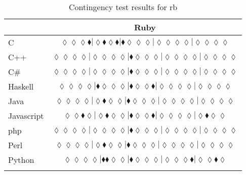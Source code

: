 \begin{table*}
\centering
\begin{tabular}{l c}
& Ruby \\
\hline

C & $\scriptscriptstyle\lozenge\lozenge\lozenge\blacklozenge|\lozenge\blacklozenge\lozenge\blacklozenge|\blacklozenge\lozenge\lozenge\lozenge|\lozenge\lozenge\lozenge\lozenge|\lozenge\lozenge\lozenge\lozenge$ \\
C++ & $\scriptscriptstyle\lozenge\lozenge\lozenge\lozenge|\lozenge\lozenge\lozenge\lozenge|\blacklozenge\lozenge\lozenge\lozenge|\lozenge\lozenge\lozenge\lozenge|\lozenge\lozenge\lozenge\lozenge$ \\
C\# & $\scriptscriptstyle\lozenge\lozenge\lozenge\lozenge|\lozenge\lozenge\lozenge\lozenge|\blacklozenge\lozenge\lozenge\lozenge|\lozenge\lozenge\lozenge\lozenge|\lozenge\lozenge\lozenge\lozenge$ \\
Haskell & $\scriptscriptstyle\lozenge\lozenge\lozenge\lozenge|\blacklozenge\lozenge\lozenge\lozenge|\blacklozenge\lozenge\lozenge\blacklozenge|\lozenge\lozenge\lozenge\lozenge|\lozenge\lozenge\lozenge\lozenge$ \\
Java & $\scriptscriptstyle\lozenge\lozenge\lozenge\lozenge|\lozenge\blacklozenge\lozenge\lozenge|\blacklozenge\lozenge\lozenge\lozenge|\lozenge\lozenge\lozenge\lozenge|\lozenge\lozenge\lozenge\lozenge$ \\
Javascript & $\scriptscriptstyle\lozenge\lozenge\blacklozenge\lozenge|\lozenge\blacklozenge\lozenge\lozenge|\blacklozenge\lozenge\lozenge\blacklozenge|\lozenge\lozenge\lozenge\lozenge|\lozenge\blacklozenge\lozenge\lozenge$ \\
{\sc php} & $\scriptscriptstyle\lozenge\lozenge\lozenge\lozenge|\lozenge\lozenge\lozenge\lozenge|\blacklozenge\lozenge\lozenge\lozenge|\lozenge\lozenge\lozenge\lozenge|\lozenge\lozenge\lozenge\lozenge$ \\
Perl & $\scriptscriptstyle\lozenge\lozenge\lozenge\lozenge|\lozenge\blacklozenge\lozenge\lozenge|\blacklozenge\lozenge\lozenge\lozenge|\lozenge\lozenge\lozenge\lozenge|\lozenge\lozenge\lozenge\lozenge$ \\
Python & $\scriptscriptstyle\lozenge\lozenge\lozenge\lozenge|\blacklozenge\blacklozenge\lozenge\lozenge|\blacklozenge\lozenge\lozenge\lozenge|\lozenge\lozenge\lozenge\blacklozenge|\lozenge\lozenge\blacklozenge\lozenge$ \\

\hline
& \\
\end{tabular}
\caption{Contingency test results for rb}
\label{tbl:contingency-test-results-rb}
\end{table*}

